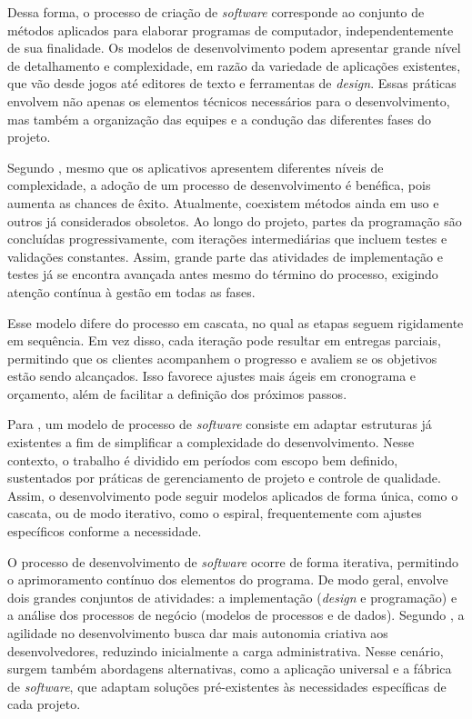 \documentclass[english,brazilian]{UNISINOSartigo} %
\begin{document}
Dessa forma, o processo de criação de \textit{software} corresponde ao conjunto de métodos aplicados para elaborar programas de computador, independentemente de sua finalidade. Os modelos de desenvolvimento podem apresentar grande nível de detalhamento e complexidade, em razão da variedade de aplicações existentes, que vão desde jogos até editores de texto e ferramentas de \textit{design}. Essas práticas envolvem não apenas os elementos técnicos necessários para o desenvolvimento, mas também a organização das equipes e a condução das diferentes fases do projeto.

Segundo , mesmo que os aplicativos apresentem diferentes níveis de complexidade, a adoção de um processo de desenvolvimento é benéfica, pois aumenta as chances de êxito. Atualmente, coexistem métodos ainda em uso e outros já considerados obsoletos. Ao longo do projeto, partes da programação são concluídas progressivamente, com iterações intermediárias que incluem testes e validações constantes. Assim, grande parte das atividades de implementação e testes já se encontra avançada antes mesmo do término do processo, exigindo atenção contínua à gestão em todas as fases.

Esse modelo difere do processo em cascata, no qual as etapas seguem rigidamente em sequência. Em vez disso, cada iteração pode resultar em entregas parciais, permitindo que os clientes acompanhem o progresso e avaliem se os objetivos estão sendo alcançados. Isso favorece ajustes mais ágeis em cronograma e orçamento, além de facilitar a definição dos próximos passos.

Para , um modelo de processo de \textit{software} consiste em adaptar estruturas já existentes a fim de simplificar a complexidade do desenvolvimento. Nesse contexto, o trabalho é dividido em períodos com escopo bem definido, sustentados por práticas de gerenciamento de projeto e controle de qualidade. Assim, o desenvolvimento pode seguir modelos aplicados de forma única, como o cascata, ou de modo iterativo, como o espiral, frequentemente com ajustes específicos conforme a necessidade.

O processo de desenvolvimento de \textit{software} ocorre de forma iterativa, permitindo o aprimoramento contínuo dos elementos do programa. De modo geral, envolve dois grandes conjuntos de atividades: a implementação (\textit{design} e programação) e a análise dos processos de negócio (modelos de processos e de dados). Segundo , a agilidade no desenvolvimento busca dar mais autonomia criativa aos desenvolvedores, reduzindo inicialmente a carga administrativa. Nesse cenário, surgem também abordagens alternativas, como a aplicação universal e a fábrica de \textit{software}, que adaptam soluções pré-existentes às necessidades específicas de cada projeto.
\end{document}
